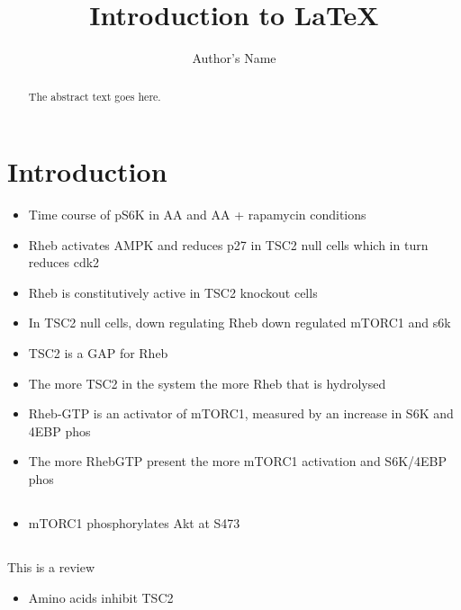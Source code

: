 \documentclass{article}
\begin{document}
\title{Introduction to \LaTeX{}}
\author{Author's Name}

\maketitle

\begin{abstract}
The abstract text goes here.
\end{abstract}

\section{Introduction}

	\begin{itemize}
		\item Time course of pS6K in AA and AA + rapamycin conditions \cite{Patursky-Polischuk2014}
		\item Rheb activates AMPK and reduces p27 in TSC2 null  cells which in turn reduces cdk2 \cite{lacher2010rheb}
		\item Rheb is constitutively active in TSC2 knockout cells \cite{lacher2010rheb}
		\item In TSC2 null cells, down regulating Rheb down regulated mTORC1 and s6k
		\item TSC2 is a GAP for Rheb~\cite{Inoki2003}
		\item The more TSC2 in the system the more Rheb that is hydrolysed \cite{Inoki2003}
		\item Rheb-GTP is an activator of mTORC1, measured by an increase in S6K and 4EBP phos
		\item The more RhebGTP present the more mTORC1 activation and S6K/4EBP phos \cite{Inoki2003}
	\end{itemize}

	\subsection{\cite{Sarbassov2005phosphorylation}}
	\begin{itemize}
		\item mTORC1 phosphorylates Akt at S473
	\end{itemize}


	\subsection{\cite{Sarbassov2005phosphorylation}}
	This is a review
	\begin{itemize}
		\item Amino acids inhibit TSC2
	\end{itemize}
\end{document}
